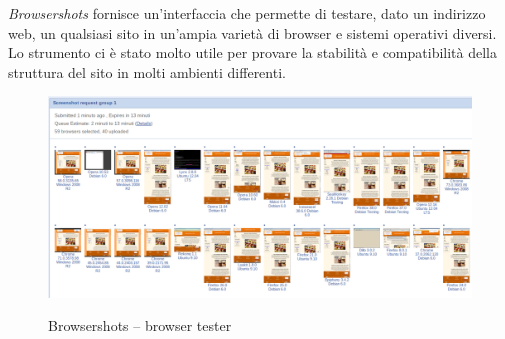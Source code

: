 \emph{Browsershots} fornisce un'interfaccia che permette di testare, dato un indirizzo web, un qualsiasi sito in un'ampia varietà di browser 
e sistemi operativi diversi.\\
Lo strumento ci è stato molto utile per provare la stabilità e compatibilità della struttura del sito in molti ambienti differenti.
\begin{figure}[!h]
	\centering
	\includegraphics[width=0.7\linewidth]{sezioni/FaseTest/Immagini/browsershots.png}\\
	\caption{Browsershots – browser tester}
	\label{Fig:browsershots}
\end{figure} 
\newpage